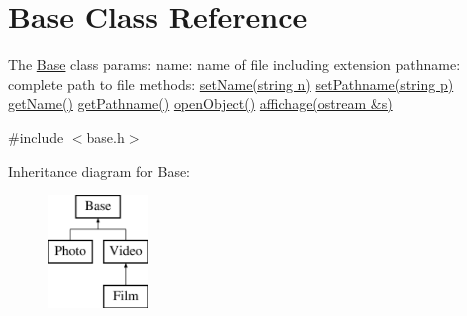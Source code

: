\hypertarget{classBase}{\section{Base Class Reference}
\label{classBase}
}


The \hyperlink{classBase}{Base} class params\-: name\-: name of file including extension pathname\-: complete path to file methods\-: \hyperlink{classBase_accfd86f100d4232debfc745b2b244dbd}{set\-Name(string n)} \hyperlink{classBase_a257547bb1e92fe64fb01863d82c5db5d}{set\-Pathname(string p)} \hyperlink{classBase_a7608d0f3a0d939fdf1068883cd9f02cd}{get\-Name()} \hyperlink{classBase_a5987267cc60429ed6a65bd1e4ffa43ab}{get\-Pathname()} \hyperlink{classBase_a117954a5c2b7e6c040cbea5a98d81795}{open\-Object()} \hyperlink{classBase_ad712ff856464b0d3fa96d07eae70a90e}{affichage(ostream \&s)}  




{\ttfamily \#include $<$base.\-h$>$}

Inheritance diagram for Base\-:\begin{figure}[H]
\begin{center}
\leavevmode
\includegraphics[height=3.000000cm]{classBase}
\end{center}
\end{figure}
